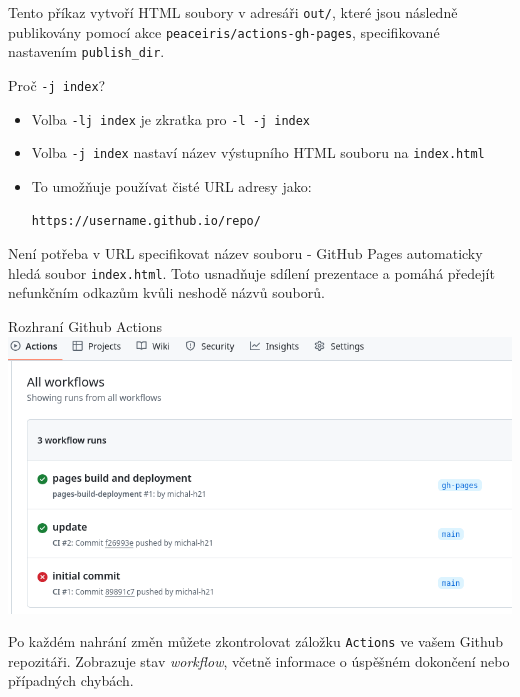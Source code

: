 Tento příkaz vytvoří HTML soubory v adresáři \texttt{out/}, které jsou následně publikovány
pomocí akce \texttt{peaceiris/actions-gh-pages}, specifikované nastavením
\texttt{publish_dir}.

\begin{frame}[fragile]{Proč \texttt{-j index}?}
\begin{itemize}
\item Volba \texttt{-lj index} je zkratka pro \texttt{-l -j index}
\item Volba \texttt{-j index} nastaví název výstupního HTML souboru na \texttt{index.html}
\item To umožňuje používat čisté URL adresy jako:

\begin{verbatim}
https://username.github.io/repo/
\end{verbatim}

\end{itemize}
\end{frame}

Není potřeba v URL specifikovat název souboru - GitHub Pages
automaticky hledá soubor \texttt{index.html}. Toto usnadňuje sdílení
prezentace a pomáhá předejít nefunkčním odkazům kvůli neshodě názvů souborů.



\begin{frame}[fragile]{Rozhraní Github Actions}
\includegraphics[width=\textwidth]{img/github-actions.png}
\end{frame}

Po každém nahrání změn  můžete zkontrolovat záložku
\texttt{Actions} ve vašem Github repozitáři. Zobrazuje stav \textit{workflow}, včetně
informace o úspěšném dokončení nebo případných chybách.

